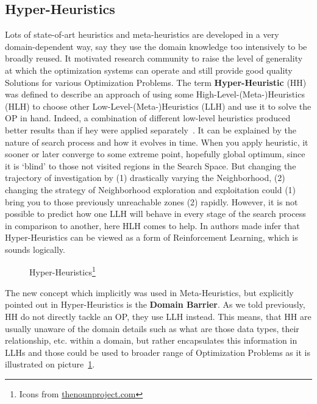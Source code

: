 \subsection{Hyper-Heuristics}\label{bg: hh}
Lots of state-of-art heuristics and meta-heuristics are developed in a very domain-dependent way, say they use the domain knowledge too intensively to be broadly reused. It motivated research community to raise the level of generality at which the optimization systems can operate and still provide good quality Solutions for various Optimization Problems. The term \textbf{Hyper-Heuristic} (HH) was defined to describe an approach of using some High-Level-(Meta-)Heuristics (HLH) to choose other Low-Level-(Meta-)Heuristics (LLH) and use it to solve the OP in hand. Indeed, a combination of different low-level heuristics produced better results than if hey were applied separately~\cite{drake2019recent}.
It can be explained by the nature of search process and how it evolves in time. When you apply heuristic, it sooner or later converge to some extreme point, hopefully global optimum, since it is `blind' to those not visited regions in the Search Space. But changing the trajectory of investigation by (1) drastically varying the Neighborhood, (2) changing the strategy of Neighborhood exploration and exploitation could (1) bring you to those previously unreachable zones (2) rapidly. However, it is not possible to predict how one LLH will behave in every stage of the search process in comparison to another, here HLH comes to help. In \cite{moriarty1999evolutionary} authors made infer that Hyper-Heuristics can be viewed as a form of Reinforcement Learning, which is sounds logically.

\begin{figure}
	\centering
	
	\caption[Hyper-Heuristics]{Hyper-Heuristics\protect\footnote{Icons from \href{https://thenounproject.com/}{thenounproject.com}}}
	\label{bg:pic:HH}
\end{figure}



The new concept which implicitly was used in Meta-Heuristics, but explicitly pointed out in Hyper-Heuristics is the \textbf{Domain Barrier}.
As we told previously, HH do not directly tackle an OP, they use LLH instead. This means, that HH are usually unaware of the domain details such as what are those data types, their relationship, etc. within a domain, but rather encapsulates this information in LLHs and those could be used to broader range of Optimization Problems as it is illustrated on picture~\ref{bg:pic:HH}.



